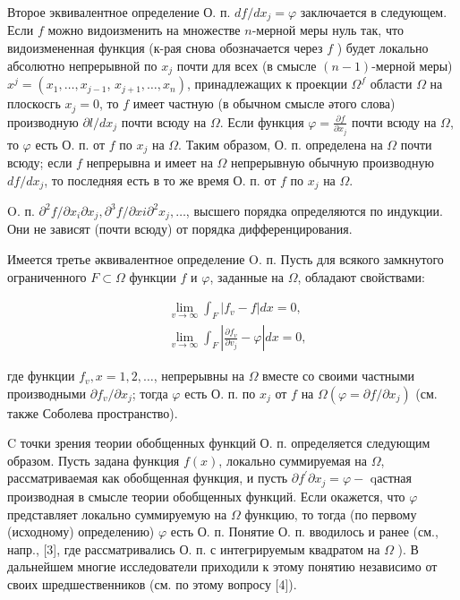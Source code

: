 \documentclass[10pt]{article}
\begin{document}
Второе эквивалентное определение О. п. $d f / d x_{j}=\varphi$ заключается в следующем. Если $f$ можно видоизменить на множестве $n$-мерной меры нуль так, что видоизмененная функция (к-рая снова обозначается через $f$ ) будет локально абсолютно непрерывной по $x_{j}$ почти для всех (в смысле $(n-1)$-мерной меры) $x^{j}=\left(x_{1}, \ldots, x_{j-1}\right.$, $\left.x_{j+1}, \ldots, x_{n}\right)$, принадлежащих к проекции $\Omega^{f}$ области $\Omega$ на плоскосгь $x_{j}=0$, то $f$ имеет частную (в обычном смысле әтого слова) производную $\partial l / d x_{j}$ почти всюду на $\Omega$. Если функция $\varphi=\frac{\partial f}{\partial x_{j}}$ почти всюду на $\Omega$, то $\varphi$ есть О. п. от $f$ по $x_{j}$ на $\Omega$. Таким образом, О. п. определена на $\Omega$ почти всюду; если $f$ непрерывна и имеет на $\Omega$ непрерывную обычную производную $d f / d x_{j}$, то последняя есть в то же время О. п. от $f$ по $x_{j}$ на $\Omega$.



O. п. $\partial^{2} f / \partial x_{i} \partial x_{j}, \partial^{3} f / \partial x i \partial^{2} x_{j}, \ldots$, высшего порядка определяются по индукции. Они не зависят (почти всюду) от порядка дифференцирования.



Имеется третье әквивалентное определение $\mathrm{O}$. п. Пусть для всякого замкнутого ограниченного $F \subset \Omega$ функции $f$ и $\varphi$, заданные на $\Omega$, обладают свойствами:



\[

\begin{aligned}

& \lim _{v \rightarrow \infty} \int_{F}\left|f_{v}-f\right| d x=0, \\

& \lim _{v \rightarrow \infty} \int_{F}\left|\frac{\partial f_{v}}{\partial v_{j}}-\varphi\right| d x=0,

\end{aligned}

\]



где функции $f_{v}, x=1,2, \ldots$, непрерывны на $\Omega$ вместе со своими частными производными $\partial f_{v} / \partial x_{j}$; тогда $\varphi$ есть О. п. по $x_{j}$ от $f$ на $\Omega\left(\varphi=\partial f / \partial x_{j}\right)$ (см. также Соболева пространство).



C точки зрения теории обобщенных функций О. п. определяется следующим образом. Пусть задана функция $f(x)$, локально суммируемая на $\Omega$, рассматриваемая как обобщенная функция, и пусть $\partial f^{\prime} \partial x_{j}=\varphi-$ qастная производная в смысле теории обобщенных функций. Если окажется, что $\varphi$ представляет локально суммируемую на $\Omega$ функцию, то тогда (по первому (исходному) определению) $\varphi$ есть О. п. Понятие О. п. вводилось и ранее (см., напр., [3], где рассматривались О. п. с интегрируемым квадратом на $\Omega$ ). В дальнейшем многие исследователи приходили к этому понятию независимо от своих шредшественников (см. по этому вопросу [4]).
\end{document}
